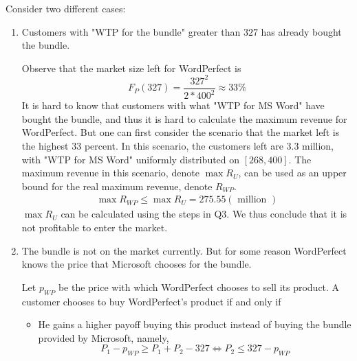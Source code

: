 \documentclass[a4paper]{article}
\begin{document}
    \begin{answer}[Q6]
        Consider two different cases:
    \begin{enumerate}
        \item Customers with "WTP for the bundle" greater than $327$ has already bought the bundle. 
        
        Observe that the market size left for WordPerfect is
        \begin{equation*}
            F_P(327) = \frac{327^2}{2*400^2} \approx 33\%
        \end{equation*}
        It is hard to know that customers with what "WTP for MS Word" have bought the bundle, and thus it is hard to calculate the maximum revenue for WordPerfect. But one can first consider the scenario that the market left is the highest $33$ percent. In this scenario, the customers left are 3.3 million, with "WTP for MS Word" uniformly distributed on $[268, 400]$. The maximum revenue in this scenario, denote $\max R_U$, can be used as an upper bound for the real maximum revenue, denote $R_{WP}$. 
        \begin{align*}
            \max R_{WP} \leq \max R_U = 275.55 ( \text{ million } )
        \end{align*}
    $\max R_U$ can be calculated using the steps in Q3.
    We thus conclude that it is not profitable to enter the market.
    
    \item The bundle is not on the market currently. But for some reason WordPerfect knows the price that Microsoft chooses for the bundle.
    
    Let $p_{WP}$ be the price with which WordPerfect chooses to sell its product. A customer chooses to buy WordPerfect's product if and only if
    \begin{itemize}
        \item He gains a higher payoff buying this product instead of buying the bundle provided by Microsoft, namely,
        \begin{equation*}
            P_1 - p_{WP} \geq P_1 + P_2 - 327 \iff P_2 \leq 327 - p_{WP}
        \end{equation*}
        

\end{itemize}
\end{enumerate}
\end{answer}
\end{document}
